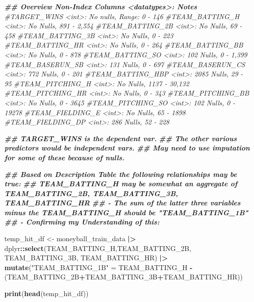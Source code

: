 \documentclass[
]{article}
\newenvironment{Shaded}{\begin{snugshade}}{\end{snugshade}}
\newcommand{\CommentTok}[1]{\textcolor[rgb]{0.56,0.35,0.01}{\textit{#1}}}
\newcommand{\DocumentationTok}[1]{\textcolor[rgb]{0.56,0.35,0.01}{\textbf{\textit{#1}}}}
\newcommand{\FunctionTok}[1]{\textcolor[rgb]{0.13,0.29,0.53}{\textbf{#1}}}
\newcommand{\NormalTok}[1]{#1}
\newcommand{\OtherTok}[1]{\textcolor[rgb]{0.56,0.35,0.01}{#1}}
\newcommand{\SpecialCharTok}[1]{\textcolor[rgb]{0.81,0.36,0.00}{\textbf{#1}}}
\newcommand{\StringTok}[1]{\textcolor[rgb]{0.31,0.60,0.02}{#1}}
\begin{document}
\begin{Shaded}
\begin{Highlighting}[]
\DocumentationTok{\#\# Overview Non{-}Index Columns \textless{}datatypes\textgreater{}:  Notes}
\CommentTok{\#TARGET\_WINS \textless{}int\textgreater{}: No nulls, Range: 0 {-} 146}
\CommentTok{\#TEAM\_BATTING\_H \textless{}int\textgreater{}: No Nulls, 891 {-} 2,554}
\CommentTok{\#TEAM\_BATTING\_2B \textless{}int\textgreater{}: No Nulls, 69 {-} 458}
\CommentTok{\#TEAM\_BATTING\_3B \textless{}int\textgreater{}: No Nulls, 0 {-} 223}
\CommentTok{\#TEAM\_BATTING\_HR \textless{}int\textgreater{}: No Nulls, 0 {-} 264}
\CommentTok{\#TEAM\_BATTING\_BB \textless{}int\textgreater{}: No Nulls, 0 {-} 878}
\CommentTok{\#TEAM\_BATTING\_SO \textless{}int\textgreater{}: 102 Nulls, 0 {-} 1,399}
\CommentTok{\#TEAM\_BASERUN\_SB \textless{}int\textgreater{}: 131 Nulls, 0 {-} 697}
\CommentTok{\#TEAM\_BASERUN\_CS \textless{}int\textgreater{}: 772 Nulls, 0 {-} 201}
\CommentTok{\#TEAM\_BATTING\_HBP \textless{}int\textgreater{}: 2085 Nulls, 29 {-} 95}
\CommentTok{\#TEAM\_PITCHING\_H \textless{}int\textgreater{}: No Nulls, 1137 {-} 30,132}
\CommentTok{\#TEAM\_PITCHING\_HR \textless{}int\textgreater{}: No Nulls, 0 {-} 343}
\CommentTok{\#TEAM\_PITCHING\_BB \textless{}int\textgreater{}: No Nulls, 0 {-} 3645}
\CommentTok{\#TEAM\_PITCHING\_SO \textless{}int\textgreater{}: 102 Nulls, 0 {-} 19278}
\CommentTok{\#TEAM\_FIELDING\_E \textless{}int\textgreater{}: No Nulls, 65 {-} 1898}
\CommentTok{\#TEAM\_FIELDING\_DP \textless{}int\textgreater{}: 286 Nulls, 52 {-} 228}

\DocumentationTok{\#\# TARGET\_WINS is the dependent var. }
\DocumentationTok{\#\# The other various predictors would be independent vars. }
\DocumentationTok{\#\# May need to use imputation for some of these because of nulls. }


\DocumentationTok{\#\# Based on Description Table the following relationships may be true: }
\DocumentationTok{\#\# TEAM\_BATTING\_H may be somewhat an aggregate of  TEAM\_BATTING\_2B, TEAM\_BATTING\_3B, TEAM\_BATTING\_HR}
\DocumentationTok{\#\# {-} The sum of the latter three variables minus the TEAM\_BATTING\_H should be "TEAM\_BATTING\_1B"}
\DocumentationTok{\#\# {-} Confirming my Understanding of this: }

\NormalTok{temp\_hit\_df }\OtherTok{\textless{}{-}}\NormalTok{ moneyball\_train\_data  }\SpecialCharTok{|\textgreater{}}
\NormalTok{  dplyr}\SpecialCharTok{::}\FunctionTok{select}\NormalTok{(TEAM\_BATTING\_H,TEAM\_BATTING\_2B, TEAM\_BATTING\_3B, TEAM\_BATTING\_HR) }\SpecialCharTok{|\textgreater{}}
  \FunctionTok{mutate}\NormalTok{(}\StringTok{"TEAM\_BATTING\_1B"} \OtherTok{=}\NormalTok{ TEAM\_BATTING\_H }\SpecialCharTok{{-}}\NormalTok{ (TEAM\_BATTING\_2B}\SpecialCharTok{+}\NormalTok{TEAM\_BATTING\_3B}\SpecialCharTok{+}\NormalTok{TEAM\_BATTING\_HR))}

\FunctionTok{print}\NormalTok{(}\FunctionTok{head}\NormalTok{(temp\_hit\_df))}
\end{Highlighting}
\end{Shaded}
\end{document}
